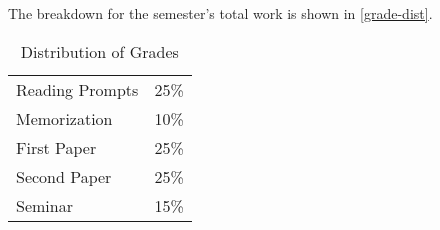 \documentclass[titlepage]{article}
\newcommand\policy{../policy}
\begin{document}
The breakdown for the semester's total work is shown in
\autoref{grade-dist}.

\begin{table}[htbp]
  \centering
  {\lining
  \begin{tabular}{lr}
    \toprule
    Reading Prompts & 25\% \\
    Memorization    & 10\% \\
    First Paper     & 25\% \\
    Second Paper    & 25\% \\
    Seminar         & 15\% \\
    \bottomrule
  \end{tabular}}
  \caption{Distribution of Grades}
  \label{grade-dist}
\end{table}



\end{document}
